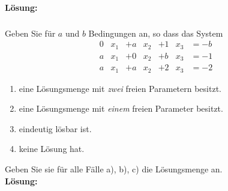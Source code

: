 \noindent \textbf{Lösung:}

\newpage
\subsubsection{} %
Geben Sie für $a$ und $b$ Bedingungen an, so dass das System
\[\begin{aligned}
0 &x_1 &+ a &x_2 &+ 1 &x_3 &= -b\\
a &x_1 &+ 0 &x_2 &+ b &x_3 &= -1\\
a &x_1 &+ a &x_2 &+ 2 &x_3 &= -2
\end{aligned}\]
\begin{enumerate}[label=\alph*)]
    \item eine Lösungsmenge mit \textit{zwei} freien Parametern besitzt.
    \item eine Lösungsmenge mit \textit{einem} freien Parameter besitzt.
    \item eindeutig lösbar ist.
    \item keine Lösung hat.
\end{enumerate}
Geben Sie sie für alle Fälle a), b), c) die Lösungsmenge an.\\

\noindent \textbf{Lösung:}